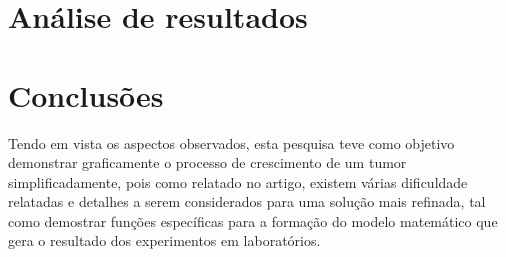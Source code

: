\documentclass[12pt]{article}
\begin{document}
\section{Análise de resultados} \label{sec:results}



\section{Conclusões} \label{sec:conclusions}

Tendo em vista os aspectos observados, esta pesquisa teve como objetivo demonstrar graficamente o processo de crescimento de um tumor simplificadamente, pois como relatado no artigo, existem várias dificuldade relatadas e detalhes a serem considerados para uma solução mais refinada, tal como demostrar funções específicas para a formação do modelo matemático que gera o resultado dos experimentos em laboratórios.   




\end{document}
